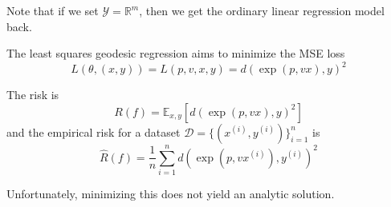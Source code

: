   Note that if we set $\mathcal{Y} = \mathbb{R}^m$, then we get the ordinary linear regression model back. 

  \begin{definition}
    \label{def:least-squares-geodesic-regression}
    The least squares geodesic regression aims to minimize the MSE loss 
    \begin{equation}
      L(\theta, (x, y)) = L(p, v, x, y) = d(\exp(p, vx), y)^2
    \end{equation}
  \end{definition}

  \begin{lemma}[Risk]
    \label{thm:risk}
    The risk is 
    \begin{equation}
      R(f) = \mathbb{E}_{x, y} \left[ d(\exp(p, vx), y)^2 \right]
    \end{equation} 
    and the empirical risk for a dataset $\mathcal{D} = \{(x^{(i)}, y^{(i)})\}_{i=1}^n$ is 
    \begin{equation}
      \hat{R}(f) = \frac{1}{n} \sum_{i=1}^n d(\exp(p, v x^{(i)}), y^{(i)})^2
    \end{equation}
  \end{lemma}

  Unfortunately, minimizing this does not yield an analytic solution. 

